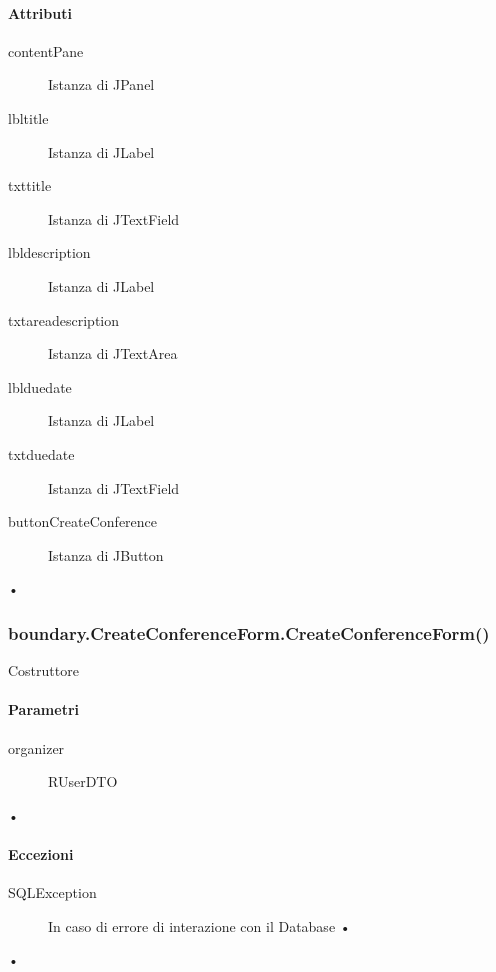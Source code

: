\paragraph{Attributi}
\begin{description}
\item[contentPane] Istanza di JPanel
\item[lbltitle] Istanza di JLabel
\item[txttitle] Istanza di JTextField
\item[lbldescription] Istanza di JLabel
\item[txtareadescription] Istanza di JTextArea
\item[lblduedate] Istanza di JLabel
\item[txtduedate] Istanza di JTextField
\item[buttonCreateConference] Istanza di JButton

\end{description}•

\subsubsection{boundary.CreateConferenceForm.CreateConferenceForm()}
Costruttore
\paragraph{Parametri}
\begin{description}
\item[organizer] RUserDTO
\end{description}•
\paragraph{Eccezioni}
\begin{description}
\item[SQLException]  In caso di errore di interazione con il Database
•
\end{description}• 














